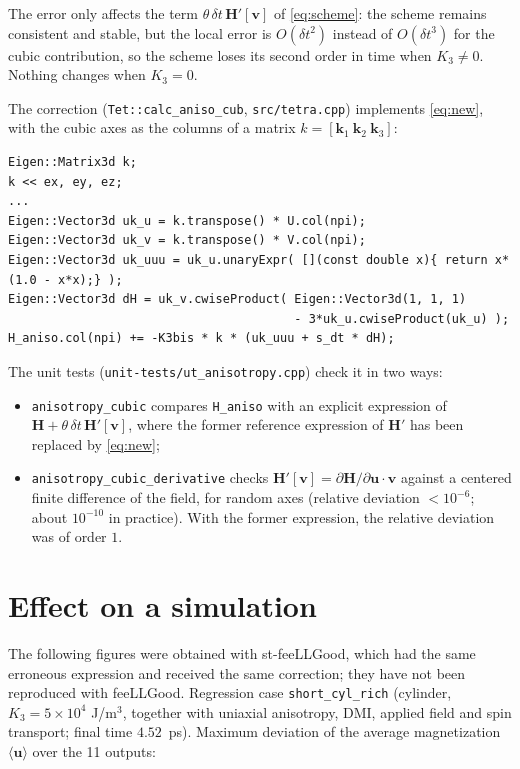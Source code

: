 \documentclass[11pt,a4paper]{article}
\newcommand{\bu}{\mathbf{u}}
\newcommand{\bv}{\mathbf{v}}
\newcommand{\bk}{\mathbf{k}}
\newcommand{\bH}{\mathbf{H}}
\begin{document}
The error only affects the term $\theta\,\delta t\,\bH'[\bv]$ of \eqref{eq:scheme}:
the scheme remains consistent and stable, but the local error is $O(\delta t^2)$
instead of $O(\delta t^3)$ for the cubic contribution, so the scheme loses its second
order in time when $K_3\neq0$. Nothing changes when $K_3=0$.

The correction (\texttt{Tet::calc\_aniso\_cub}, \texttt{src/tetra.cpp}) implements
\eqref{eq:new}, with the cubic axes as the columns of a matrix $k=[\bk_1\ \bk_2\ \bk_3]$:
\begin{lstlisting}
Eigen::Matrix3d k;
k << ex, ey, ez;
...
Eigen::Vector3d uk_u = k.transpose() * U.col(npi);
Eigen::Vector3d uk_v = k.transpose() * V.col(npi);
Eigen::Vector3d uk_uuu = uk_u.unaryExpr( [](const double x){ return x*(1.0 - x*x);} );
Eigen::Vector3d dH = uk_v.cwiseProduct( Eigen::Vector3d(1, 1, 1)
                                        - 3*uk_u.cwiseProduct(uk_u) );
H_aniso.col(npi) += -K3bis * k * (uk_uuu + s_dt * dH);
\end{lstlisting}

The unit tests (\texttt{unit-tests/ut\_anisotropy.cpp}) check it in two ways:
\begin{itemize}
\item \texttt{anisotropy\_cubic} compares \texttt{H\_aniso} with an explicit expression
  of $\bH+\theta\,\delta t\,\bH'[\bv]$, where the former reference expression of $\bH'$
  has been replaced by \eqref{eq:new};
\item \texttt{anisotropy\_cubic\_derivative} checks
  $\bH'[\bv]=\partial\bH/\partial\bu\cdot\bv$ against a centered finite difference of the
  field, for random axes (relative deviation $<10^{-6}$; about $10^{-10}$ in practice).
  With the former expression, the relative deviation was of order $1$.
\end{itemize}

\section{Effect on a simulation}

The following figures were obtained with st-feeLLGood, which had the same erroneous
expression and received the same correction; they have not been reproduced with
feeLLGood. Regression case \texttt{short\_cyl\_rich} (cylinder, $K_3=5\times10^4$
J/m$^3$, together with uniaxial anisotropy, DMI, applied field and spin transport;
final time $4.52$~ps). Maximum deviation of the average magnetization
$\langle\bu\rangle$ over the 11 outputs:
\end{document}
